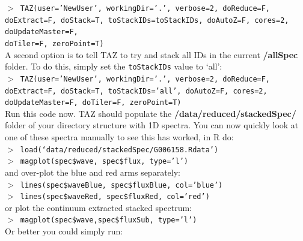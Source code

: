 \documentclass[12pt]{article}
\begin{document}
  \hspace{10mm} \texttt{$>$ TAZ(user='NewUser', workingDir='.', verbose=2, doReduce=F, doExtract=F, doStack=T,  toStackIDs=toStackIDs, doAutoZ=F, cores=2, doUpdateMaster=F, \\ doTiler=F, zeroPoint=T)}\\ 
  
 A second option is to tell TAZ to try and stack all IDs in the current \textbf{/allSpec} folder. To do this, simply set the \texttt{toStackIDs} value to `all': \\
  

  \hspace{10mm} \texttt{$>$ TAZ(user='NewUser', workingDir='.', verbose=2, doReduce=F, doExtract=F, doStack=T,  toStackIDs='all', doAutoZ=F, cores=2, doUpdateMaster=F, doTiler=F, zeroPoint=T)}\\   

Run this code now. TAZ should populate the \textbf{/data/reduced/stackedSpec/} folder of your directory structure with 1D spectra. You can now quickly look at one of these spectra manually to see this has worked, in R do:\\

\hspace{10mm} \texttt{$>$ load(`data/reduced/stackedSpec/G006158.Rdata')} \\

\hspace{10mm} \texttt{$>$ magplot(spec\$wave, spec\$flux, type='l')} \\

and over-plot the blue and red arms separately:\\


\hspace{10mm} \texttt{$>$ lines(spec\$waveBlue, spec\$fluxBlue, col='blue')}\\

\hspace{10mm} \texttt{$>$ lines(spec\$waveRed, spec\$fluxRed, col='red')}\\

or plot the continuum extracted stacked spectrum:\\

\hspace{10mm} \texttt{$>$ magplot(spec\$wave,spec\$fluxSub, type='l')}\\

Or better you could simply run:\\
\end{document}
